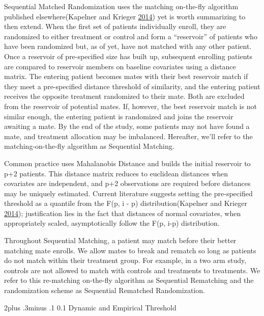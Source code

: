 \documentclass[12pt,oneside]{book}
\makeatletter
\newlength{\li}\setlength{\li}{14.48pt}
\newlength{\di}\setlength{\di}{-3.5mm}
\renewcommand\section{ \@startsection {section}{1}{\z@}%
    {2\@bls  plus .3\@bls minus .1\@bls}%
    {0.1\@bls}%
    {\centering\normalfont}}
\theoremstyle{definition}
\theoremstyle{definition}
\theoremstyle{definition}
\theoremstyle{remark}
\makeatother
\begin{document}
Sequential Matched Randomization uses the matching on-the-fly algorithm
published elsewhere(Kapelner and Krieger
\protect\hyperlink{ref-Kapelner:2014cu}{2014}) yet is worth summarizing
to then extend. When the first set of patients individually enroll, they
are randomized to either treatment or control and form a ``reservoir''
of patients who have been randomized but, as of yet, have not matched
with any other patient. Once a reservoir of pre-specified size has built
up, subsequent enrolling patients are compared to reservoir members on
baseline covariates using a distance matrix. The entering patient
becomes mates with their best reservoir match if they meet a
pre-specified distance threshold of similarity, and the entering patient
receives the opposite treatment randomized to their mate. Both are
excluded from the reservoir of potential mates. If, however, the best
reservoir match is not similar enough, the entering patient is
randomized and joins the reservoir awaiting a mate. By the end of the
study, some patients may not have found a mate, and treatment allocation
may be imbalanced. Hereafter, we'll refer to the matching-on-the-fly
algorithm as Sequential Matching.

Common practice uses Mahalanobis Distance and builds the initial
reservoir to p+2 patients. This distance matrix reduces to euclidean
distances when covariates are independent, and p+2 observations are
required before distances may be uniquely estimated. Current literature
suggests setting the pre-specified threshold as a quantile from the F(p,
i - p) distribution(Kapelner and Krieger
\protect\hyperlink{ref-Kapelner:2014cu}{2014}); justification lies in
the fact that distances of normal covariates, when appropriately scaled,
asymptotically follow the F(p, i-p) distribution.

Throughout Sequential Matching, a patient may match before their better
matching mate enrolls. We allow mates to break and rematch so long as
patients do not match within their treatment group. For example, in a
two arm study, controls are not allowed to match with controls and
treatments to treatments. We refer to this re-matching on-the-fly
algorithm as Sequential Rematching and the randomization scheme as
Sequential Rematched Randomization.

\hypertarget{dynamic-and-empirical-threshold}{%
\section{Dynamic and Empirical
Threshold}\label{dynamic-and-empirical-threshold}}
\end{document}
